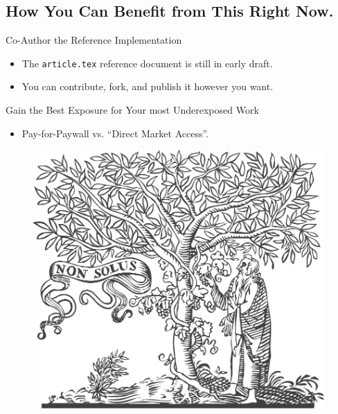 		\subsection{How You Can Benefit from This Right Now.}
			\begin{frame}{Co-Author the Reference Implementation}
				\begin{itemize}
					\item The \colorbox{tlg}{\texttt{article.tex}} reference document is still in early draft.
					\item You can contribute, fork, and publish it however you want.
				\end{itemize}
			\end{frame}
			\begin{frame}{Gain the Best Exposure for Your most Underexposed Work}
				\begin{itemize}
					\item Pay-for-Paywall vs. “Direct Market Access”.
				\end{itemize}
				\begin{minipage}{0.49\textwidth}
					\begin{figure}
						\centering
						\includegraphics[width=0.99\textwidth]{img/elsevier.pdf}
					\end{figure}
				\end{minipage}
			\end{frame}
